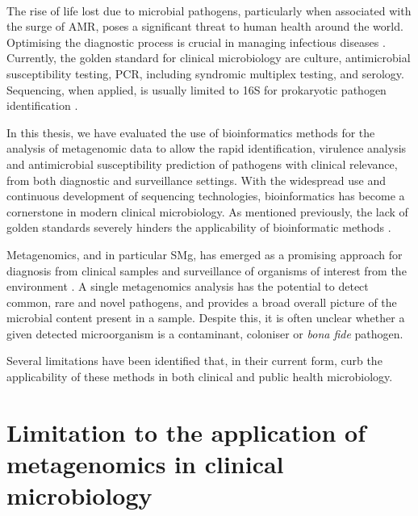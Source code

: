 \renewcommand*{\thefootnote}{\arabic{footnote}}

\mbox{}\\
\vspace{8cm}

The rise of life lost due to microbial pathogens, particularly when associated with the surge of \ac{AMR}, poses a significant threat to human health around the world. Optimising the diagnostic process is crucial in managing infectious diseases \citep{vos_global_2020}. Currently, the golden standard for clinical microbiology are culture, antimicrobial susceptibility testing, \ac{PCR}, including syndromic multiplex testing, and serology. Sequencing, when applied, is usually limited to 16S for prokaryotic pathogen identification \citep{greninger_challenge_2018}. 

In this thesis, we have evaluated the use of bioinformatics methods for the analysis of metagenomic data to allow the rapid identification, virulence analysis and antimicrobial susceptibility prediction of pathogens with clinical relevance, from both diagnostic and surveillance settings. With the widespread use and continuous development of sequencing technologies, bioinformatics has become a cornerstone in modern clinical microbiology. As mentioned previously, the lack of golden standards severely hinders the applicability of bioinformatic methods \citep{carrico_primer_2018, couto_critical_2018, angers-loustau_challenges_2018, gruening_recommendations_2019, sczyrba_critical_2017}. 

Metagenomics, and in particular \ac{SMg}, has emerged as a promising approach for diagnosis from clinical samples and surveillance of organisms of interest from the environment \citep{loman_culture-independent_2013, rossen__2018, schuele_future_2021, chiu_clinical_2019}. A single metagenomics analysis has the potential to detect common, rare and novel pathogens, and provides a broad overall picture of the microbial content present in a sample. Despite this, it is often unclear whether a given detected microorganism is a contaminant, coloniser or \textit{bona fide} pathogen. 

Several limitations have been identified that, in their current form, curb the applicability of these methods in both clinical and public health microbiology. 

\section{Limitation to the application of metagenomics in clinical microbiology}

